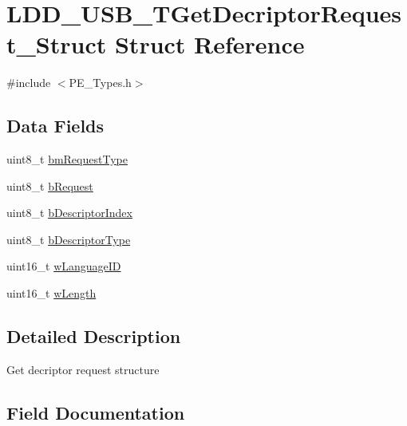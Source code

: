 \hypertarget{struct_l_d_d___u_s_b___t_get_decriptor_request___struct}{}\section{L\+D\+D\+\_\+\+U\+S\+B\+\_\+\+T\+Get\+Decriptor\+Request\+\_\+\+Struct Struct Reference}
\label{struct_l_d_d___u_s_b___t_get_decriptor_request___struct}


{\ttfamily \#include $<$P\+E\+\_\+\+Types.\+h$>$}

\subsection*{Data Fields}
\begin{DoxyCompactItemize}
\item 
uint8\+\_\+t \hyperlink{struct_l_d_d___u_s_b___t_get_decriptor_request___struct_a1a1b11552faed99a5e0b5a08c315aa2e}{bm\+Request\+Type}
\item 
uint8\+\_\+t \hyperlink{struct_l_d_d___u_s_b___t_get_decriptor_request___struct_aa7651472aa5110086f335c0b79c0bc5b}{b\+Request}
\item 
uint8\+\_\+t \hyperlink{struct_l_d_d___u_s_b___t_get_decriptor_request___struct_acdeb70eb4f83efe2fb38cf58aa99e4f1}{b\+Descriptor\+Index}
\item 
uint8\+\_\+t \hyperlink{struct_l_d_d___u_s_b___t_get_decriptor_request___struct_abfebebabbabe02e816da51fe202282a7}{b\+Descriptor\+Type}
\item 
uint16\+\_\+t \hyperlink{struct_l_d_d___u_s_b___t_get_decriptor_request___struct_a228c41af26c45c1fa18d964c0702a4b4}{w\+Language\+I\+D}
\item 
uint16\+\_\+t \hyperlink{struct_l_d_d___u_s_b___t_get_decriptor_request___struct_af9ac7409b4031aa6f3ec5da9d79b06eb}{w\+Length}
\end{DoxyCompactItemize}


\subsection{Detailed Description}
Get decriptor request structure 

\subsection{Field Documentation}
\hypertarget{struct_l_d_d___u_s_b___t_get_decriptor_request___struct_acdeb70eb4f83efe2fb38cf58aa99e4f1}{}
